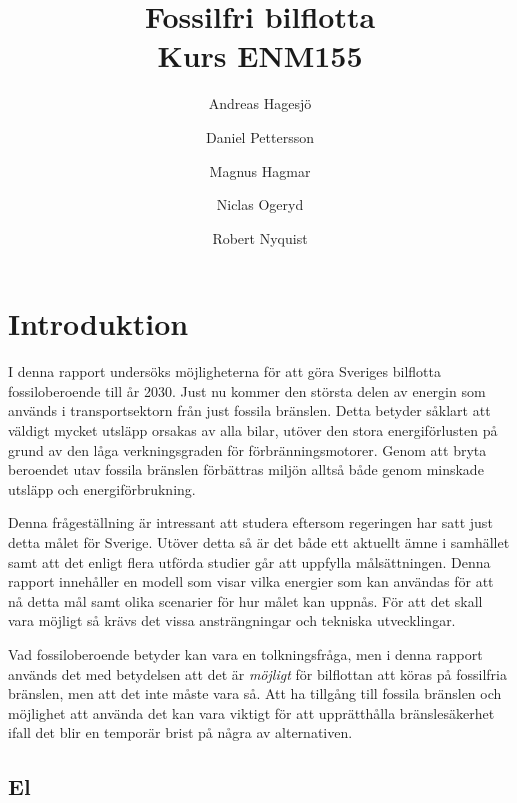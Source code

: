 \documentclass[a4paper,11pt,fleqn, titlepage]{article}
\author{Andreas Hagesjö \and Daniel Pettersson \and
Magnus Hagmar \and Niclas Ogeryd \and Robert Nyquist}
\title{Fossilfri bilflotta \\ Kurs ENM155}
\begin{document}
\maketitle

\section{Introduktion}
I denna rapport undersöks möjligheterna för att göra Sveriges bilflotta
fossiloberoende till år 2030. Just nu kommer den största delen av energin
som används i transportsektorn från just fossila bränslen. Detta betyder
såklart att väldigt mycket utsläpp orsakas av alla bilar, utöver den stora
energiförlusten på grund av den låga verkningsgraden för
förbränningsmotorer. Genom att bryta beroendet utav fossila bränslen
förbättras miljön alltså både genom minskade utsläpp och energiförbrukning.

Denna frågeställning är intressant att studera eftersom regeringen har satt
just detta målet för Sverige. Utöver detta så är det både ett aktuellt ämne
i samhället samt att det enligt flera utförda studier går att uppfylla
målsättningen. Denna rapport innehåller en modell som visar vilka energier
som kan användas för att nå detta mål samt olika scenarier för hur målet
kan uppnås. För att det skall vara möjligt så krävs det vissa
ansträngningar och tekniska utvecklingar.

Vad fossiloberoende betyder kan vara en tolkningsfråga, men i denna rapport
används det med betydelsen att det är \emph{möjligt} för bilflottan att
köras på fossilfria bränslen, men att det inte måste vara så. Att ha tillgång
till fossila bränslen och möjlighet att använda det kan vara viktigt för
att upprätthålla bränslesäkerhet ifall det blir en temporär brist på
några av alternativen.

\subsection{El}
\end{document}
